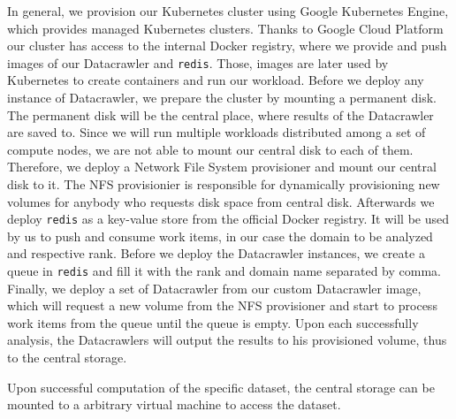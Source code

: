 In general, we provision our Kubernetes cluster using Google Kubernetes Engine, which provides managed Kubernetes clusters. Thanks to Google Cloud Platform our cluster has access to the internal Docker registry, where we provide and push images of our Datacrawler and \texttt{redis}. Those, images are later used by Kubernetes to create containers and run our workload. Before we deploy any instance of Datacrawler, we prepare the cluster by mounting a permanent disk. The permanent disk will be the central place, where results of the Datacrawler are saved to. Since we will run multiple workloads distributed among a set of compute nodes, we are not able to mount our central disk to each of them. Therefore, we deploy a Network File System provisioner and mount our central disk to it. The NFS provisionier is responsible for dynamically provisioning new volumes for anybody who requests disk space from central disk. Afterwards we deploy \texttt{redis} as a key-value store from the official Docker registry. It will be used by us to push and consume work items, in our case the domain to be analyzed and respective rank. Before we deploy the Datacrawler instances, we create a queue in \texttt{redis} and fill it with the rank and domain name separated by comma. Finally, we deploy a set of Datacrawler from our custom Datacrawler image, which will request a new volume from the NFS provisioner and start to process work items from the queue until the queue is empty. Upon each successfully analysis, the Datacrawlers will output the results to his provisioned volume, thus to the central storage.

Upon successful computation of the specific dataset, the central storage can be mounted to a arbitrary virtual machine to access the dataset. 

